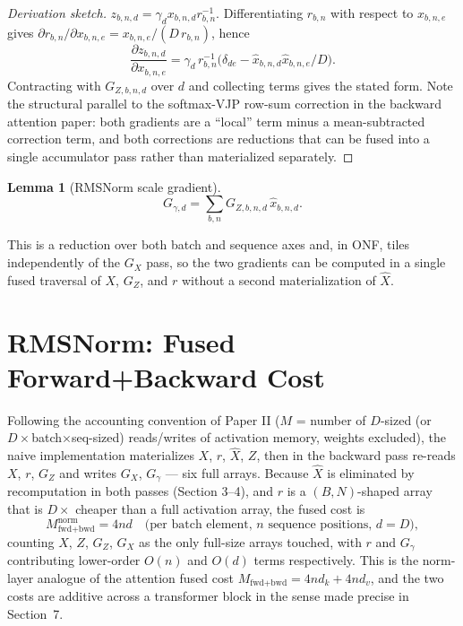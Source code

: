 \documentclass[11pt]{article}
\theoremstyle{definition}
\newtheorem{lemma}{Lemma}
\begin{document}
\begin{proof}[Derivation sketch]
$z_{b,n,d} = \gamma_d x_{b,n,d} r_{b,n}^{-1}$. Differentiating $r_{b,n}$
with respect to $x_{b,n,e}$ gives $\partial r_{b,n}/\partial x_{b,n,e} =
x_{b,n,e}/(D\, r_{b,n})$, hence
\[
\frac{\partial z_{b,n,d}}{\partial x_{b,n,e}} =
\gamma_d\, r_{b,n}^{-1}\Big(\delta_{de} - \hat x_{b,n,d}\hat
x_{b,n,e}/D\Big).
\]
Contracting with $G_{Z,b,n,d}$ over $d$ and collecting terms gives the
stated form. Note the structural parallel to the softmax-VJP row-sum
correction in the backward attention paper: both gradients are a
``local'' term minus a mean-subtracted correction term, and both
corrections are reductions that can be fused into a single accumulator
pass rather than materialized separately.
\end{proof}

\begin{lemma}[RMSNorm scale gradient]
\[
G_{\gamma,d} = \sum_{b,n} G_{Z,b,n,d}\,\hat x_{b,n,d}.
\]
\end{lemma}

This is a reduction over both batch and sequence axes and, in ONF, tiles
independently of the $G_X$ pass, so the two gradients can be computed in
a single fused traversal of $X$, $G_Z$, and $r$ without a second
materialization of $\hat X$.

\section{RMSNorm: Fused Forward+Backward Cost}

Following the accounting convention of Paper II ($M$ = number of
$D$-sized (or $D\times$batch$\times$seq-sized) reads/writes of
activation memory, weights excluded), the naive implementation
materializes $X$, $r$, $\hat X$, $Z$, then in the backward pass re-reads
$X$, $r$, $G_Z$ and writes $G_X$, $G_\gamma$ --- six full arrays.
Because $\hat X$ is eliminated by recomputation in both passes (Section
3--4), and $r$ is a $(B,N)$-shaped array that is $D\times$ cheaper than
a full activation array, the fused cost is
\[
M^{\mathrm{norm}}_{\text{fwd+bwd}} = 4nd \quad \text{(per batch element, } n
\text{ sequence positions, } d = D\text{)},
\]
counting $X$, $Z$, $G_Z$, $G_X$ as the only full-size arrays touched,
with $r$ and $G_\gamma$ contributing lower-order $O(n)$ and $O(d)$
terms respectively. This is the norm-layer analogue of the attention
fused cost $M_{\text{fwd+bwd}} = 4nd_k + 4nd_v$, and the two costs are
additive across a transformer block in the sense made precise in
Section~7.
\end{document}
